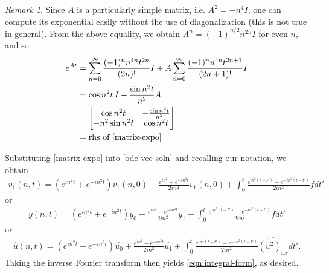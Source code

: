 \documentclass[12pt,reqno]{amsart}
\numberwithin{equation}{section}  %
\numberwithin{figure}{section}
\newcommand{\wh}{\widehat}
\theoremstyle{plain}
\theoremstyle{definition}
\theoremstyle{remark}
\newtheorem{remark}{Remark}
\begin{document}
%
%
%
\pagebreak
%
\begin{framed}
\begin{remark}
\label{rem:simpler-comp}
  Since $A$ is a particularly simple matrix, i.e. $A^{2} = -n^{4} I$, one can
  compute its exponential easily without the use of diagonalization (this is
  not true in general). From the above equality, we obtain $A^{n} =
  (-1)^{n/2} n^{2n} I$ for even $n$, and so
  \begin{equation*}
  \begin{split}
    e^{At}
    & = \sum_{n=0}^{\infty} \frac{(-1)^{n}n^{4n}t^{2n}}{(2n)!}I + A
    \sum_{n=0}^{\infty} \frac{(-1)^{n} n^{4n} t^{2n + 1}}{(2n + 1)!} I 
    \\
    & = \cos n^{2}t \, I - \frac{\sin n^{2}t}{n^{2}}A
    \\
    & = 
    \begin{bmatrix}
      \cos n^{2}t &  -\frac{\sin n^{2}t}{n^{2}}
      \\
      - n^{2} \sin n^{2}t & \cos n^{2}t
    \end{bmatrix}
    \\
    & = \text{rhs of }\eqref{matrix-expo}
  \end{split}
  \end{equation*}
\end{remark}
\end{framed}
%
%
Substituting \eqref{matrix-expo} into \eqref{ode-vec-soln} and recalling our notation, we obtain
%
%
\begin{equation*}
\begin{split}
  v_{1}(n, t) = (e^{in^{2}t} + e^{-in^{2}t})v_{1}(n, 0) + \frac{e^{in^{2}} -
  e^{-in^{2}t}}{2 i n^{2}} v_{1}(n, 0) + \int_{0}^{t} \frac{e^{in^{2}(t - t')} -
  e^{-in^{2}(t-t')}}{2 i n^{2}} f dt'
\end{split}
\end{equation*}
%
%
or
\begin{equation*}
\begin{split}
  y(n, t) = (e^{in^{2}t} + e^{-in^{2}t})y_{0} + \frac{e^{in^{2}} -
  e^{-in^{2}t}}{2 i n^{2}} y_{1} + \int_{0}^{t} \frac{e^{in^{2}(t - t')} -
  e^{-in^{2}(t-t')}}{2 i n^{2}} f dt'
\end{split}
\end{equation*}
or
\begin{equation*}
\begin{split}
  \wh{u}(n, t) = (e^{in^{2}t} + e^{-in^{2}t})\wh{u_0} + \frac{e^{in^{2}} -
  e^{-in^{2}t}}{2 i n^{2}} \wh{u_1} + \int_{0}^{t} \frac{e^{in^{2}(t - t')} -
  e^{-in^{2}(t-t')}}{2 i n^{2}} \wh{(u^{2})_{xx}} dt'.
\end{split}
\end{equation*}
%
Taking the inverse Fourier transform then yields \eqref{eqn:integral-form}, as
desired.
%
%
\end{document}

